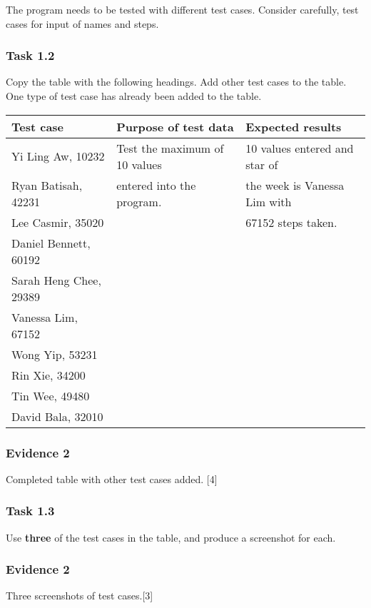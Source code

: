 The program needs to be tested with different test cases. Consider
carefully, test cases for input of names and steps. 

\subsubsection*{Task 1.2}

Copy the table with the following headings. Add other test cases to
the table. One type of test case has already been added to the table.
\begin{center}
\begin{tabular}{|l|l|l|}
\hline 
\hspace{0.05\columnwidth}\textbf{Test case} & \textbf{Purpose of test data} & \textbf{Expected results}\tabularnewline
\hline 
Yi Ling Aw, 10232 & Test the maximum of 10 values & 10 values entered and star of\tabularnewline
Ryan Batisah, 42231 & entered into the program. & the week is Vanessa Lim with\tabularnewline
Lee Casmir, 35020 &  & 67152 steps taken.\tabularnewline
Daniel Bennett, 60192 &  & \tabularnewline
Sarah Heng Chee, 29389 &  & \tabularnewline
Vanessa Lim, 67152 &  & \tabularnewline
Wong Yip, 53231 &  & \tabularnewline
Rin Xie, 34200 &  & \tabularnewline
Tin Wee, 49480 &  & \tabularnewline
David Bala, 32010 &  & \tabularnewline
\hline 
\end{tabular}
\par\end{center}

\subsubsection*{Evidence 2}

Completed table with other test cases added. \hfill{}{[}4{]}

\subsubsection*{Task 1.3}

Use \textbf{three} of the test cases in the table, and produce a screenshot
for each.

\subsubsection*{Evidence 2}

Three screenshots of test cases.\hfill{}{[}3{]}